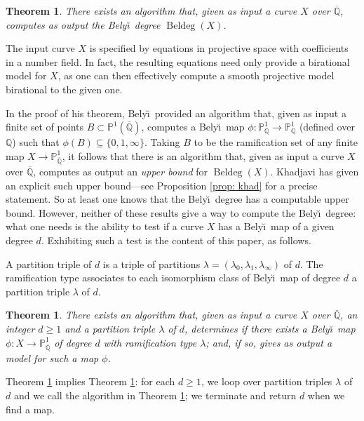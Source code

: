 \documentclass{amsproc}
\numberwithin{equation}{section}
\numberwithin{figure}{section}
\newtheorem{theorem}[equation]{Theorem}
\theoremstyle{definition}
\theoremstyle{remark}
\DeclareMathOperator{\Beldeg}{Beldeg}
\newcommand{\Qbar}{\overline{\mathbb{Q}}}
\newcommand{\Q}{\QQ}
\newcommand\PP{\mathbb{P}}
\newcommand\QQ{\mathbb{Q}}
\newcommand{\p}{\mathbb{P}}
\renewcommand{\geq}{\geqslant}
\newcommand{\Belyi}{Bely\u{\i}}
\newcommand{\defi}[1]{\textsf{#1}} 	%
\begin{document}
\begin{theorem} \label{mainresult}
There exists an algorithm that, given as input a curve $X$ over $\Qbar$, computes as output the \Belyi\ degree $\Beldeg(X)$.
\end{theorem}

The input curve $X$ is specified by equations in projective space with coefficients in a number field.  In fact, the resulting equations need only provide a birational model for $X$, as one can then effectively compute a smooth projective model birational to the given one.

In the proof of his theorem, \Belyi\ provided an algorithm that, given as input a finite set of points $B\subset \p^1(\Qbar)$, computes a \Belyi\ map $\phi\colon \p^1_\Q\to \p^1_\Q$ (defined over $\Q$) such that $\phi(B)\subseteq \{0,1,\infty\}$.  Taking $B$ to be the ramification set of any finite map $X \to \p^1_{\Qbar}$, it follows that there is an algorithm that, given as input a curve $X$ over $\Qbar$, computes as output an \emph{upper bound} for $\Beldeg(X)$.  Khadjavi \cite{Khadjavi} has given an explicit such upper bound---see Proposition \ref{prop: khad} for a precise statement.  So at least one knows that the \Belyi\ degree has a computable upper bound.  However, neither of these results give a way to compute the \Belyi\ degree: what one needs is the ability to test if a curve $X$ has a \Belyi\ map of a given degree $d$.  Exhibiting such a test is the content of this paper, as follows.

A \defi{partition triple} of $d$ is a triple of partitions $\lambda=(\lambda_0,\lambda_1,\lambda_\infty)$ of $d$.  The ramification type associates to each isomorphism class of \Belyi\ map of degree $d$ a partition triple $\lambda$ of $d$.  

\begin{theorem} \label{mainresult:really}  
There exists an algorithm that, given as input a curve $X$ over $\Qbar$, an integer $d\geq 1$ and a partition triple $\lambda$ of $d$, determines if there exists a \Belyi\ map $\phi\colon X \to \PP^1_{\Qbar}$ of degree $d$ with ramification type $\lambda$; and, if so, gives as output a model for such a map $\phi$.  
\end{theorem}

 
 

Theorem \ref{mainresult:really} implies Theorem \ref{mainresult}: for each $d \geq 1$, we loop over partition triples $\lambda$ of $d$ and we call the algorithm in Theorem \ref{mainresult:really}; we terminate and return $d$ when we find a map.
\end{document}

